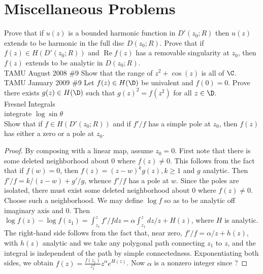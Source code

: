 \documentclass[11pt]{book}
\theoremstyle{definition}
\renewcommand{\Re}{\operatorname{Re}}
\begin{document}
\chapter{Miscellaneous Problems}
Prove that if $u(z)$ is a bounded harmonic function in $D'(z_0;R)$ then $u(z)$ extends to be harmonic in the full disc $D(z_0;R)$.
Prove that if $f(z)\in H(D'(z_0;R))$ and $\Re f(z)$ has a removable singularity at $z_0$, then $f(z)$ extends to be analytic in $D(z_0;R)$.
\\TAMU August 2008 \#9 Show that the range of $z^2+\cos(z)$ is all of $\C$.
\\TAMU January 2009 \#9 Let $f(z)\in H(\D)$ be univalent and $f(0)=0$. Prove there exists $g(z)\in H(\D)$ such that $g(z)^2=f(z^2)$ for all $z\in\D$.
\\ Fresnel Integrals
\\ integrate $\log\sin\theta$
\\ Show that if $f\in H(D'(z_0;R))$ and if $f'/f$ has a simple pole at $z_0$, then $f(z)$ has either a zero or a pole at $z_0$.
\begin{proof}
By composing with a linear map, assume $z_0=0$. First note that there is some deleted neighborhood about 0 where $f(z)\neq 0$. This follows from the fact that if $f(w)=0$, then $f(z)=(z-w)^kg(z), k\geq1$ and $g$ analytic. Then $f'/f = k/(z-w)+g'/g$, whence $f'/f$ has a pole at $w$. Since the poles are isolated, there must exist some deleted neighborhood about 0 where $f(z)\neq 0$. Choose such a neighborhood. We may define $\log f$ so as to be analytic off imaginary axis and 0. Then $\log f(z) - \log f(z_1) = \int_{z_1}^z f'/f dz = \alpha \int_{z_1}^z dz/z + H(z)$, where $H$ is analytic. The right-hand side follows from the fact that, near zero, $f'/f = \alpha/z + h(z)$, with $h(z)$ analytic and we take any polygonal path connecting $z_1$ to $z$, and the integral is independent of the path by simple connectedness. Exponentiating both sides, we obtain $f(z)=\frac{f(z_1)}{z_1^{\alpha}}z^{\alpha}e^{H(z)}$. Now $\alpha$ is a nonzero integer since ?
\end{proof}
\end{document}
